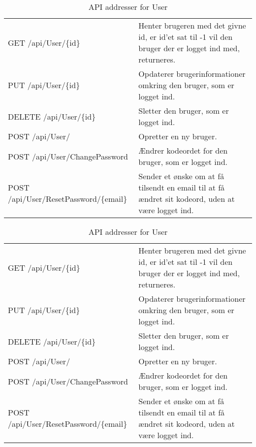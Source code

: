 \begin{table}[H]
	\centering
	\caption{API addresser for User}
	\label{tab:web_user}
	\begin{tabular}{|L{0.3\textwidth}|L{0.70\textwidth}|}
		\hline
		\\
		\hline
		GET \newline
		/api/User/\{id\} &
		Henter brugeren med det givne id, er id'et sat til -1 vil den bruger der er logget ind med, returneres. \\
		\hline
		PUT \newline
		/api/User/\{id\} &
		Opdaterer brugerinformationer omkring den bruger, som er logget ind. \\
		\hline
		DELETE \newline
		/api/User/\{id\} &
		Sletter den bruger, som er logget ind. \\
		\hline
		POST \newline
		/api/User/ &
		Opretter en ny bruger. \\
		\hline
		POST \newline
		/api/User/ChangePassword &
		Ændrer kodeordet for den bruger, som er logget ind. \\
		\hline
		POST \newline
		/api/User/ResetPassword/\{email\} &
		Sender et ønske om at få tilsendt en email til at få ændret sit kodeord, uden at være logget ind. 
		\\
		\hline
	\end{tabular}
\end{table}

\begin{table}[H]
	\centering
	\caption{API addresser for User}
	\label{tab:web_user}
	\begin{tabular}{|L{0.3\textwidth}|L{0.70\textwidth}|}
		\hline
		\\
		\hline
		GET \newline
		/api/User/\{id\} &
		Henter brugeren med det givne id, er id'et sat til -1 vil den bruger der er logget ind med, returneres. \\
		\hline
		PUT \newline
		/api/User/\{id\} &
		Opdaterer brugerinformationer omkring den bruger, som er logget ind. \\
		\hline
		DELETE \newline
		/api/User/\{id\} &
		Sletter den bruger, som er logget ind. \\
		\hline
		POST \newline
		/api/User/ &
		Opretter en ny bruger. \\
		\hline
		POST \newline
		/api/User/ChangePassword &
		Ændrer kodeordet for den bruger, som er logget ind. \\
		\hline
		POST \newline
		/api/User/ResetPassword/\{email\} &
		Sender et ønske om at få tilsendt en email til at få ændret sit kodeord, uden at være logget ind. 
		\\
		\hline
	\end{tabular}
\end{table}